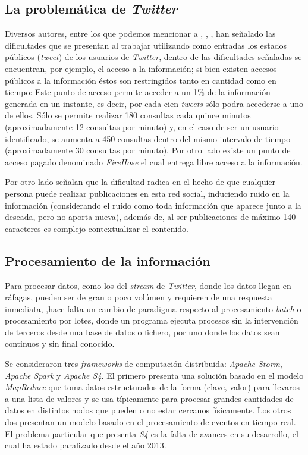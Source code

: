 \subsection{La problemática de \textit{Twitter}}
\label{intro:ea:probTwitter}

Diversos autores, entre los que podemos mencionar a \cite{VanDeVoort}, \cite{EventDetectionInTwitter}, \cite{Maldonado}, han señalado las dificultades que se presentan al trabajar utilizando como entradas los estados públicos (\textit{tweet}) de los usuarios de \textit{Twitter}, dentro de las dificultades señaladas se encuentran, por ejemplo, el acceso a la información; si bien existen accesos públicos a la información éstos son restringidos tanto en cantidad como en tiempo: Este punto de acceso permite acceder a un 1\% de la información generada en un instante, es decir, por cada cien \textit{tweets} sólo podra accederse a uno de ellos. Sólo se permite realizar 180 consultas cada quince minutos (aproximadamente 12 consultas por minuto) y, en el caso de ser un usuario identificado, se aumenta a 450 consultas dentro del mismo intervalo de tiempo (aproximadamente 30 consultas por minuto). Por otro lado existe un punto de acceso pagado denominado \textit{FireHose} el cual entrega libre acceso a la información.

Por otro lado \cite{VanDeVoort} señalan que la dificultad radica en el hecho de que cualquier persona puede realizar publicaciones en esta red social, induciendo ruido en la información (considerando el ruido como toda información que aparece junto a la deseada, pero no aporta nueva), además de, al ser publicaciones de máximo 140 caracteres es complejo contextualizar el contenido.

\subsection{Procesamiento de la información}
\label{intro:ea:procesamiento}

Para procesar datos, como los del \textit{stream} de \textit{Twitter}, donde los datos llegan en ráfagas, pueden ser de gran o poco volúmen y requieren de una respuesta inmediata, \cite{HarwoodPeter},hace falta un cambio de paradigma respecto al procesamiento \textit{batch} o procesamiento por lotes, donde un programa ejecuta procesos sin la intervención de terceros desde una base de datos o fichero, por uno donde los datos sean continuos y sin final conocido.
 
Se consideraron tres \textit{frameworks} de computación distribuida: \textit{Apache Storm}, \textit{Apache Spark} y \textit{Apache S4}. El primero presenta una solución basado en el modelo \textit{MapReduce} que toma datos estructurados de la forma (clave, valor) para llevaros a una lista de valores y se usa típicamente para procesar grandes cantidades de datos en distintos nodos que pueden o no estar cercanos físicamente. Los otros dos presentan un modelo basado en el procesamiento de eventos en tiempo real. El problema particular que presenta \textit{S4} es la falta de avances en su desarrollo, el cual ha estado paralizado desde el año 2013. 

